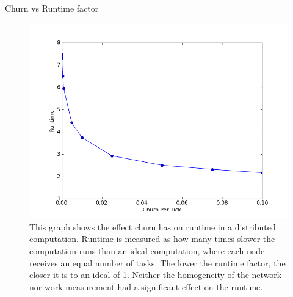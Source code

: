 \documentclass[11pt]{beamer}
\begin{document}
\begin{frame}{Churn vs Runtime factor}
	\begin{figure}[h]
		\centering
		\includegraphics[width=0.7\linewidth]{figs/churnVsTime}
		\caption[Churn vs Runtime factor]{This graph shows the effect churn has on runtime in a distributed computation.
			Runtime is measured as how many times slower the computation runs than an ideal computation, where each node receives an equal number of tasks.
			The lower the runtime factor, the closer it is to an ideal of 1.
			Neither the homogeneity of the network nor work measurement had a significant effect on the runtime.}
		\label{fig:churnVsTime}
	\end{figure}
\end{frame}


%
\end{document}
